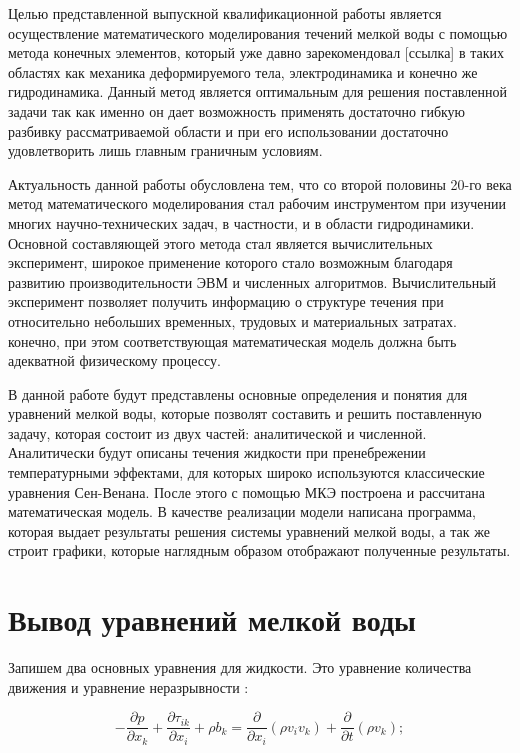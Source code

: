 \documentclass[14pt]{extreport}
\begin{document}
Целью представленной выпускной квалификационной работы является осуществление математического моделирования течений мелкой воды с помощью метода конечных элементов, который уже давно зарекомендовал [ссылка] в таких областях как механика деформируемого тела, электродинамика и конечно же гидродинамика. Данный метод является оптимальным для решения поставленной задачи так как именно он дает возможность применять достаточно гибкую разбивку рассматриваемой области и при его использовании достаточно удовлетворить лишь главным граничным условиям.

Актуальность данной работы обусловлена тем, что со второй половины 20-го века метод математического моделирования стал рабочим инструментом при изучении многих научно-технических задач, в частности, и в области гидродинамики. Основной составляющей этого метода стал является вычислительных эксперимент, широкое применение которого стало возможным благодаря развитию производительности ЭВМ и численных алгоритмов. Вычислительный эксперимент позволяет получить информацию о структуре течения при относительно небольших временных, трудовых и материальных затратах. конечно, при этом соответствующая математическая модель должна быть адекватной физическому процессу.

В данной работе будут представлены основные определения и понятия для уравнений мелкой воды, которые позволят составить и решить поставленную задачу, которая состоит из двух частей: аналитической и численной. Аналитически будут описаны течения жидкости при пренебрежении температурными эффектами, для которых широко используются классические уравнения Сен-Венана. После этого с помощью МКЭ построена и рассчитана математическая модель. В качестве реализации модели написана программа, которая выдает результаты решения системы уравнений мелкой воды, а так же строит графики, которые наглядным образом отображают полученные результаты.

\chapter{Вывод уравнений мелкой воды}

Запишем два основных уравнения для жидкости. Это уравнение количества движения и уравнение неразрывности \cite{bib:fem:konor}:

\begin{equation}\label{eq:shallow_water:1}
-\frac{\partial p}{\partial x_k} + \frac{\partial \tau_{ik}}{\partial x_i} + \rho b_k = \frac{\partial}{\partial x_i}(\rho v_i v_k) + \frac{\partial}{\partial t}(\rho v_k);
\end{equation}
\end{document}
